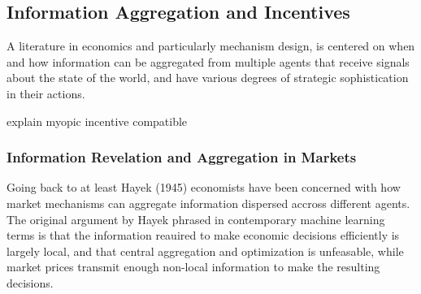 



\subsection{Information Aggregation and Incentives}

A literature in economics and particularly mechanism design, is centered on when and how information can be aggregated from multiple agents that receive signals about the state of the world, and have various degrees of strategic sophistication in their actions.

explain myopic incentive compatible

\subsubsection{Information Revelation and Aggregation in Markets}



Going back to at least Hayek (1945) economists have been concerned with how market mechanisms can aggregate information dispersed accross different agents. The original argument by Hayek phrased in contemporary machine learning terms is that the information reauired to make economic decisions efficiently is largely local, and that central aggregation and optimization is unfeasable, while market prices transmit enough non-local information to make the resulting decisions.




